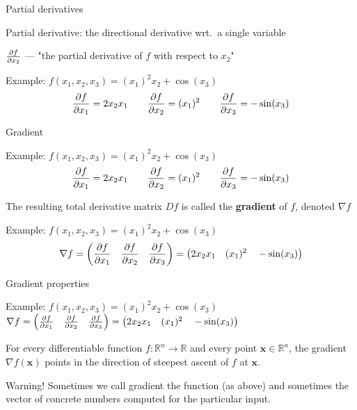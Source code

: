 \documentclass[12pt,aspectratio=169]{beamer}
\begin{document}
\begin{frame}{Partial derivatives}

Partial derivative: the directional derivative wrt.\ a single variable

\bigskip

$\pdv{f}{x_2}$ --- "the partial derivative of $f$ with respect to $x_2$"

\bigskip

\begin{block}{Example: $f(x_1, x_2, x_3) = (x_1)^2 x_2 + \cos(x_3)$}
$$
\pdv{f}{x_1} = 2 x_2 x_1 \qquad \pdv{f}{x_2} = (x_1)^2 \qquad \pdv{f}{x_3} = - \sin (x_3)
$$
\end{block}


\end{frame}


\begin{frame}{Gradient}

\begin{block}{Example: $f(x_1, x_2, x_3) = (x_1)^2 x_2 + \cos(x_3)$}
	$$
	\pdv{f}{x_1} = 2 x_2 x_1 \qquad \pdv{f}{x_2} = (x_1)^2 \qquad \pdv{f}{x_3} = - \sin (x_3)
	$$
\end{block}


The resulting total derivative matrix $Df$ is called the \textbf{gradient} of $f$, denoted $\nabla f$

\begin{block}{Example: $f(x_1, x_2, x_3) = (x_1)^2 x_2 + \cos(x_3)$}
$$
\nabla f = \left( \pdv{f}{x_1} \quad \pdv{f}{x_2} \quad \pdv{f}{x_3} \right) = 
\left(
2 x_2 x_1  \quad (x_1)^2  \quad - \sin (x_3)
\right)
$$
\end{block}

	
\end{frame}

\begin{frame}{Gradient properties}
	
\begin{block}{Example: $f(x_1, x_2, x_3) = (x_1)^2 x_2 + \cos(x_3)$}
$\nabla f = \left( \pdv{f}{x_1} \quad \pdv{f}{x_2} \quad \pdv{f}{x_3} \right) = 
	\left(
	2 x_2 x_1  \quad (x_1)^2  \quad - \sin (x_3)
	\right)$
\end{block}

For every differentiable function $f : \mathbb{R}^n \to \mathbb{R}$ and every point $\bm{x} \in \mathbb{R}^n$, the gradient $\nabla f(\bm{x})$ points in the direction of steepest ascent of $f$ at $\bm{x}$.

\bigskip

\begin{block}{Warning!}
Sometimes we call gradient the function (as above) and sometimes the vector of concrete numbers computed for the particular input.
\end{block}



\end{frame}
\end{document}
